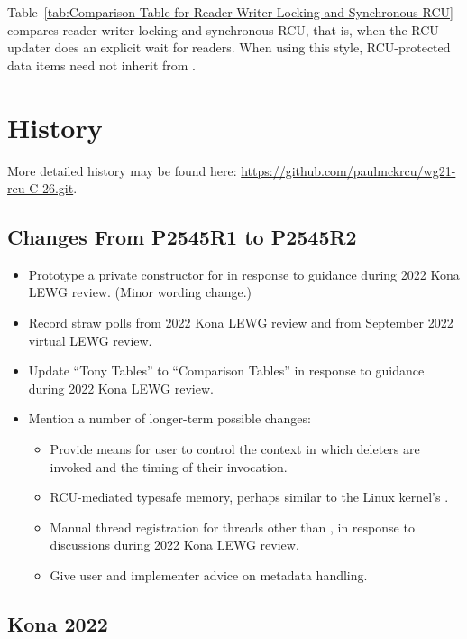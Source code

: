 Table~\ref{tab:Comparison Table for Reader-Writer Locking and Synchronous RCU}
compares reader-writer locking and synchronous RCU, that is, when the
RCU updater does an explicit wait for readers.
When using this style, RCU-protected data items need not inherit from
.

\section{History}
\label{sec:History}

More detailed history may be found here:
\url{https://github.com/paulmckrcu/wg21-rcu-C-26.git}.

\subsection{Changes From P2545R1 to P2545R2}
\label{sec:Changes From P2545R1 to P2545R2}

\begin{itemize}
\item	Prototype a private constructor for  in response
	to guidance during 2022 Kona LEWG review.
	(Minor wording change.)
\item	Record straw polls from 2022 Kona LEWG review and from
	September 2022 virtual LEWG review.
\item	Update ``Tony Tables'' to ``Comparison Tables'' in response to
	guidance during 2022 Kona LEWG review.
\item	Mention a number of longer-term possible changes:
	\begin{itemize}
	\item	Provide means for user to control the context in
		which deleters are invoked and the timing of their
		invocation.
	\item	RCU-mediated typesafe memory, perhaps similar to the
		Linux kernel's .
	\item	Manual thread registration for threads other than
		, in response to discussions during
		2022 Kona LEWG review.
	\item	Give user and implementer advice on 
		metadata handling.
	\end{itemize}
\end{itemize}

\subsection{Kona 2022}
\label{sec:Kona 2022}

